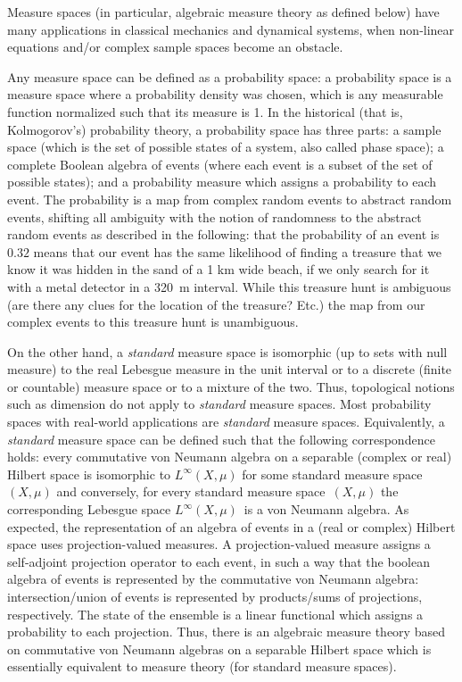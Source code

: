 \documentclass[11pt]{book}
\begin{document}
Measure spaces (in particular, algebraic measure theory as defined
below) have many applications in classical mechanics and dynamical
systems\cite{mauroy2020koopman}, when non-linear equations and/or complex sample spaces
become an obstacle.

Any measure space can be defined as a probability space: a probability
space is a measure space where a probability density was chosen, which
is any measurable function normalized such that its measure is 1. In the
historical (that is, Kolmogorov's) probability theory, a probability
space has three parts: a sample space (which is the set of possible
states of a system, also called phase space); a complete Boolean algebra
of events (where each event is a subset of the set of possible states);
and a probability measure which assigns a probability to each event. The
probability is a map from complex random events to abstract random
events, shifting all ambiguity with the notion of randomness to the
abstract random events as described in the following: that the
probability of an event is \(0.32\) means that our event has the same
likelihood of finding a treasure that we know it was hidden in the sand
of a 1 km wide beach, if we only search for it with a metal detector in
a 320~m interval. While this treasure hunt is ambiguous (are there any
clues for the location of the treasure? Etc.) the map from our complex
events to this treasure hunt is unambiguous.

On the other hand, a \emph{standard} measure space is isomorphic (up to
sets with null measure) to the real Lebesgue measure in the unit
interval or to a discrete (finite or countable) measure space or to a
mixture of the two. Thus, topological notions such as dimension do not
apply to \emph{standard} measure spaces. Most probability spaces with
real-world applications are \emph{standard }measure spaces.
Equivalently, a \emph{standard} measure space can be defined such that
the following correspondence holds: every commutative von Neumann
algebra on a separable (complex or real) Hilbert space is isomorphic to
\(L^\infty(X,\mu)\) for some standard measure space \((X,\mu)\) and
conversely, for every standard measure space~\((X,\mu)\) the
corresponding Lebesgue space \(L^\infty(X,\mu)\)~is a von Neumann
algebra. As expected, the representation of an algebra of events in a
(real or complex) Hilbert space uses projection-valued
measures\cite{Pedro2013On}\cite{Moretti2016Quantum}\cite{Li2003Real}\cite{Moretti2013Spectral}. A
projection-valued measure assigns a self-adjoint projection operator to
each event, in such a way that the boolean algebra of events is
represented by the commutative von Neumann algebra: intersection/union
of events is represented by products/sums of projections, respectively.
The state of the ensemble is a linear functional which assigns a
probability to each projection. Thus, there is an algebraic measure
theory\cite{mauroy2020koopman}\cite{whittle2000probability}\cite{aps}\cite{algprob} based on
commutative von Neumann algebras on a separable Hilbert space which is
essentially equivalent to measure theory (for standard measure spaces).
\end{document}
